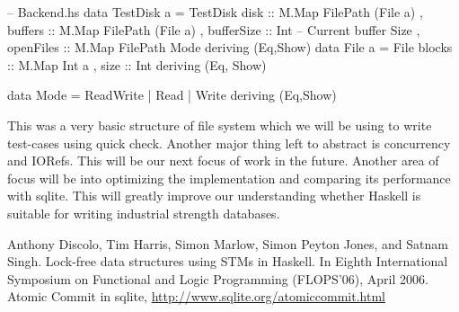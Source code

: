 \documentclass[11pt,a4paper]{article}
\begin{document}
\begin{code}[name=Backend]
-- Backend.hs
data TestDisk a = TestDisk {
    disk :: M.Map FilePath (File a)
   , buffers :: M.Map FilePath (File a) 
   , bufferSize :: Int -- Current buffer Size 
   , openFiles :: M.Map FilePath Mode
    } deriving (Eq,Show)
data File a = File {
    blocks :: M.Map Int a 
   , size :: Int 
    } deriving (Eq, Show)

data Mode = ReadWrite | Read | Write deriving (Eq,Show) 
\end{code}

This was a very basic structure of file system which we will be using to write test-cases using quick check. Another major thing left to abstract is concurrency and IORefs. This will be our next focus of work in the future. Another area of focus will be into optimizing the implementation and comparing its performance with sqlite. This will greatly improve our understanding whether Haskell is suitable for writing industrial strength databases. 



\begin{thebibliography}{10}
Anthony Discolo, Tim Harris, Simon Marlow, Simon Peyton Jones, and Satnam Singh. Lock-free data structures using STMs in Haskell. In Eighth International Symposium on Functional and Logic Programming (FLOPS’06), April 2006.
Atomic Commit in sqlite, \url{http://www.sqlite.org/atomiccommit.html}
\end{thebibliography}
\end{document}
